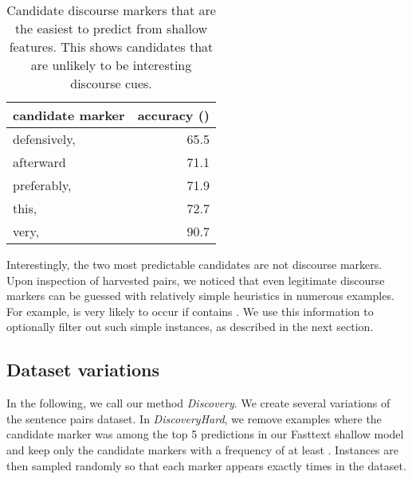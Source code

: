 \documentclass[11pt,a4paper]{article}
\begin{document}
\begin{table}[htb]
\begin{center}
\begin{tabular}{lr}
\toprule
    candidate marker &  accuracy  ()\\
\midrule
 defensively, &      65.5 \\
    afterward &      71.1 \\
  preferably, &      71.9 \\
        this, &      72.7 \\
        very, &      90.7 \\
\bottomrule
\end{tabular}
\end{center}
\caption{Candidate discourse markers that are the easiest to predict from shallow features. This shows candidates that are unlikely to be interesting discourse cues.}
\label{table:mostpredictable}
\end{table}

Interestingly, the two most predictable candidates are not discourse markers. Upon inspection of harvested pairs, we noticed that even legitimate discourse markers can be guessed with relatively simple heuristics in numerous examples.
For example,  is very likely to occur if  contains . 
We use this information to optionally filter out such simple instances, as described in the next section.


\subsection{Dataset variations}

In the following, we call our method \textit{Discovery}.
We create several variations of the sentence pairs dataset. In \textit{DiscoveryHard}, we remove examples where the candidate marker was among the top 5 predictions in our Fasttext shallow model and keep only the  candidate markers with a frequency of at least . Instances are then sampled randomly so that each marker appears exactly  times in the dataset.
\end{document}
